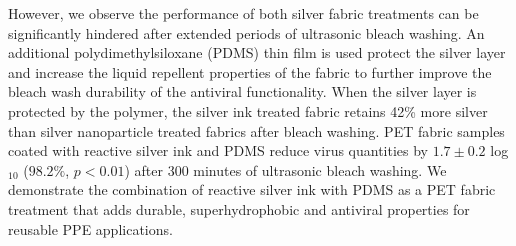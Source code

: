 \documentclass[10pt,letterpaper]{article}
\begin{document}
However, we observe the performance of both silver fabric treatments can be significantly hindered after extended periods of ultrasonic bleach washing. 
An additional polydimethylsiloxane (PDMS) thin film is used protect the silver layer and increase the liquid repellent properties of the fabric to further improve %
the bleach wash durability of the antiviral functionality. 
When the silver layer is protected by the polymer, the silver ink treated fabric retains 42\% more silver than silver nanoparticle treated fabrics after bleach washing.
PET fabric samples coated with reactive silver ink and PDMS reduce virus quantities by $1.7 \pm 0.2$ log$_{10}$ ($98.2 %
\%$, $p < 0.01$) after 300 minutes of ultrasonic bleach washing. 
We demonstrate the combination of reactive silver ink with PDMS as a PET fabric treatment that adds durable, superhydrophobic and antiviral properties for reusable PPE applications. 


\end{document}
